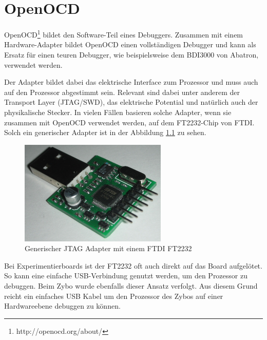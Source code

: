 \chapter{OpenOCD}
OpenOCD\footnote{http://openocd.org/about/} bildet den Software-Teil eines Debuggers.
Zusammen mit einem Hardware-Adapter bildet OpenOCD einen vollständigen Debugger und kann als Ersatz für einen teuren Debugger, wie beispielsweise dem BDI3000 von Abatron, verwendet werden.

Der Adapter bildet dabei das elektrische Interface zum Prozessor und muss auch auf den Prozessor abgestimmt sein.
Relevant sind dabei unter anderem der Transport Layer (JTAG/SWD), das elektrische Potential und natürlich auch der physikalische Stecker.
In vielen Fällen basieren solche Adapter, wenn sie zusammen mit OpenOCD verwendet werden, auf dem FT2232-Chip von FTDI.
Solch ein generischer Adapter ist in der Abbildung \ref{fig:GenerischerFT2232Adapter} zu sehen.

\begin{figure}[htbp]
	\centering
		\includegraphics[width=7cm,keepaspectratio]{images/JTAGAdapter.jpg}
	\caption[Generischer JTAG Adapter mit einem FTDI FT2232]{Generischer JTAG Adapter mit einem FTDI FT2232\footnotemark}
	\label{fig:GenerischerFT2232Adapter}
\end{figure}

Bei Experimentierboards ist der FT2232 oft auch direkt auf das Board aufgelötet.
So kann eine einfache USB-Verbindung genutzt werden, um den Prozessor zu debuggen.
Beim Zybo wurde ebenfalls dieser Ansatz verfolgt.
Aus diesem Grund reicht ein einfaches USB Kabel um den Prozessor des Zybos auf einer Hardwareebene debuggen zu können.



